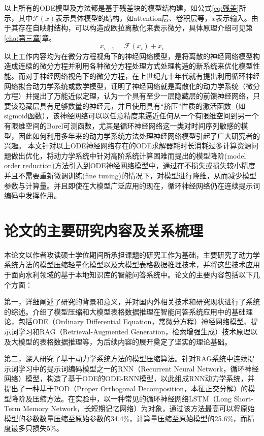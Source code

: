 以上所有的ODE模型及方法都是基于残差块\cite{weinan2017proposal}的模型结构建，如公式\ref{eq:残差}所示，其中\(\mathcal{F}(x)\)表示具体模型的结构，如attention层、卷积层等，$x$表示输入。由于其存在自映射结构，可以构造成欧拉离散化来表示微分，具体原理介绍可见第\ref{cha:第三章}章。
\begin{equation}
  \label{eq:残差}
  x_{i+1} = \mathcal{F}(x_i) + x_i
\end{equation}
以上工作内容均为在微分方程视角下的神经网络模型，是将离散的神经网络模型构造成连续的微分方程并利用各种微分方程处理方式处理构造的新系统来优化模型性能。而对于神经网络视角下的微分方程，在上世纪九十年代就有提出利用循环神经网络拟合动力学系统或数学模型\cite{cybenko1989approximation,li2022deep,cao2018brits,pearlmutter1989learning,neil2016phased,che2018recurrent}，证明了神经网络就是离散化的动力学系统（微分方程）并提出了万能近似定理，认为一个具有至少一层隐藏层的前馈神经网络，只要该隐藏层具有足够数量的神经元，并且使用具有“挤压”性质的激活函数（如sigmoid函数），该神经网络可以以任意精度来逼近任何从一个有限维空间到另一个有限维空间的Borel可测函数，尤其是循环神经网络这一类对时间序列敏感的模型，因此如何利用多年来的动力学系统方法处理神经网络模型引起了广大研究者的兴趣。
本文针对以上ODE神经网络存在的ODE求解器耗时长消耗过多计算资源问题做出优化，将动力学系统中针对高阶系统计算困难而提出的模型降阶(model order reduction)方法引入到ODE神经网络模型中，通过在不损失或损失较小精度并且不需要重新微调训练(fine tuning)的情况下，对模型进行降维，从而减少模型参数与计算量。并且即使在大模型广泛应用的现在，循环神经网络仍在连续提示词编码中发挥作用。


\section{论文的主要研究内容及关系梳理}
本论文以作者攻读硕士学位期间所承担课题的研究工作为基础，主要研究了动力学系统方法的模型压缩轻量化模型以及大模型表格数据推理技术，并将这些技术应用于面向水利领域的基于本地知识库的智能问答系统中。论文的主要内容包括以下几个方面： 

第一，详细阐述了研究的背景和意义，并对国内外相关技术和研究现状进行了系统的综述。介绍了模型压缩和大模型表格数据推理在智能问答系统应用中的基础理论，包括ODE（Ordinary Differential Equation，常微分方程）神经网络模型、提示词学习和RAG（Retrieval-Augmented Generation，检索增强生成）技术原理以及大模型的表格数据推理等，为后续内容的展开奠定了坚实的理论基础。 

第二，深入研究了基于动力学系统方法的模型压缩算法。针对RAG系统中连续提示词学习中的提示词编码模型之一的RNN（Recurrent Neural Network，循环神经网络）模型，构造了基于ODE的ODE-RNN模型，以此组成RNN动力学系统，并提出了一种基于POD（Proper Orthogonal Decomposition，本征正交分解）的模型降阶及压缩方法。在实验中，以一种常见的循环神经网络LSTM（Long Short-Term Memory Network，长短期记忆网络）为对象，通过该方法最高可以将原始模型的参数数量压缩至原始参数的34.4\%，计算量压缩至原始模型的25.6\%，而精度最多只损失5\%。

